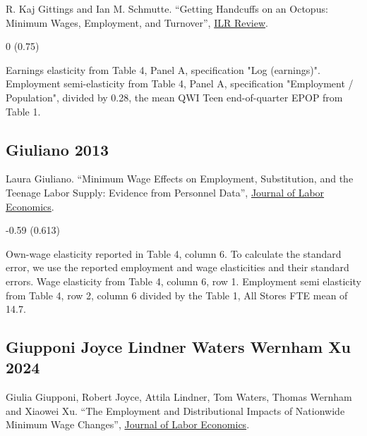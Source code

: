 \noindent R. Kaj Gittings and Ian M. Schmutte. ``Getting Handcuffs on an Octopus: Minimum Wages, Employment, and Turnover'', \href{https://doi.org/10.1177/0019793915623519}{ILR Review}.

\vspace{0.7em}

 0 (0.75)

\vspace{0.7em}

 Earnings elasticity from Table 4, Panel A, specification "Log (earnings)". Employment semi-elasticity from Table 4, Panel A, specification "Employment / Population", divided by 0.28, the mean QWI Teen end-of-quarter EPOP from Table 1.

\subsection*{Giuliano 2013}
\vspace{-0.7em}

\noindent Laura Giuliano. ``Minimum Wage Effects on Employment, Substitution, and the Teenage Labor Supply: Evidence from Personnel Data'', \href{https://doi.org/10.1086/666921}{Journal of Labor Economics}.

\vspace{0.7em}

 -0.59 (0.613)

\vspace{0.7em}

 Own-wage elasticity reported in Table 4, column 6. To calculate the standard error, we use the reported employment and wage elasticities and their standard errors. Wage elasticity from Table 4, column 6, row 1. Employment semi elasticity from Table 4, row 2, column 6 divided by the Table 1, All Stores FTE mean of 14.7.

\subsection*{Giupponi Joyce Lindner Waters Wernham Xu 2024}
\vspace{-0.7em}

\noindent Giulia Giupponi, Robert Joyce, Attila Lindner, Tom Waters, Thomas Wernham and Xiaowei Xu. ``The Employment and Distributional Impacts of Nationwide Minimum Wage Changes'', \href{https://doi.org/10.1086/728471}{Journal of Labor Economics}.

